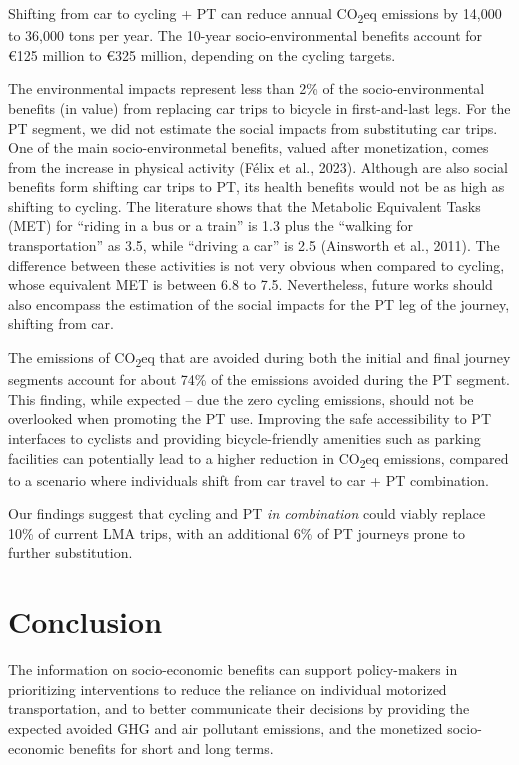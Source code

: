 \documentclass[review, doubleblind, 3p,
authoryear]{elsarticle} %
\begin{document}
Shifting from car to cycling + PT can reduce annual
CO\textsubscript{2}eq emissions by 14,000 to 36,000 tons per year. The
10-year socio-environmental benefits account for €125 million to €325
million, depending on the cycling targets.

The environmental impacts represent less than 2\% of the
socio-environmental benefits (in value) from replacing car trips to
bicycle in first-and-last legs. For the PT segment, we did not estimate
the social impacts from substituting car trips. One of the main
socio-environmetal benefits, valued after monetization, comes from the
increase in physical activity (Félix et al., 2023). Although are also
social benefits form shifting car trips to PT, its health benefits would
not be as high as shifting to cycling. The literature shows that the
Metabolic Equivalent Tasks (MET) for ``riding in a bus or a train'' is
1.3 plus the ``walking for transportation'' as 3.5, while ``driving a
car'' is 2.5 (Ainsworth et al., 2011). The difference between these
activities is not very obvious when compared to cycling, whose
equivalent MET is between 6.8 to 7.5. Nevertheless, future works should
also encompass the estimation of the social impacts for the PT leg of
the journey, shifting from car.

The emissions of CO\textsubscript{2}eq that are avoided during both the
initial and final journey segments account for about 74\% of the
emissions avoided during the PT segment. This finding, while expected --
due the zero cycling emissions, should not be overlooked when promoting
the PT use. Improving the safe accessibility to PT interfaces to
cyclists and providing bicycle-friendly amenities such as parking
facilities can potentially lead to a higher reduction in
CO\textsubscript{2}eq emissions, compared to a scenario where
individuals shift from car travel to car + PT combination.

Our findings suggest that cycling and PT \emph{in combination} could
viably replace 10\% of current LMA trips, with an additional 6\% of PT
journeys prone to further substitution.

\hypertarget{conclusion}{%
\section{Conclusion}\label{conclusion}}

The information on socio-economic benefits can support policy-makers in
prioritizing interventions to reduce the reliance on individual
motorized transportation, and to better communicate their decisions by
providing the expected avoided GHG and air pollutant emissions, and the
monetized socio-economic benefits for short and long terms.
\end{document}
